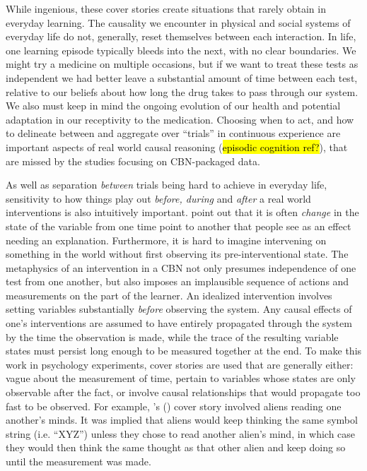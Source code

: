 \documentclass{cambridge7A}%
\def\citeapos#1{\citeauthor{#1}'s (\citeyear{#1})}
\DeclareMathOperator*{\Do}{do}
\begin{document}
While ingenious, these cover stories create situations that rarely obtain in everyday learning.  The causality we encounter in physical and social systems of everyday life do not, generally, reset themselves between each interaction.  In life, one learning episode typically bleeds into the next, with no clear boundaries.  We might try a medicine on multiple occasions, but if we want to treat these tests as independent we had better leave a substantial amount of time between each test, relative to our beliefs about how long the drug takes to pass through our system.  We also must keep in mind the ongoing evolution of our health and potential adaptation in our receptivity to the medication. Choosing when to act, and how to delineate between and aggregate over ``trials'' in continuous experience are important aspects of real world causal reasoning (\hl{episodic cognition ref?}), that are missed by the studies focusing on CBN-packaged data.  %

As well as separation \emph{between} trials being hard to achieve in everyday life, sensitivity to how things play out \emph{before, during} and \emph{after} a real world interventions is also intuitively important.   \cite{rottman2012causal} point out that it is often \emph{change} in the state of the variable from one time point to another that people see as an effect needing an explanation.  Furthermore, it is hard to imagine intervening on something in the world without first observing its pre-interventional state.  The metaphysics of an intervention in a CBN not only presumes independence of one test from one another, but also imposes an implausible sequence of actions and measurements on the part of the learner.  An idealized intervention involves setting variables substantially \emph{before} observing the system.  Any causal effects of one's interventions are assumed to have entirely propagated through the system by the time the observation is made, while the trace of the resulting variable states must persist long enough to be measured together at the end.  %
To make this work in psychology experiments, cover stories are used that are generally either: vague about the measurement of time, pertain to variables whose states are only observable after the fact, or  involve causal relationships that would propagate too fast to be observed.  For example, \citeapos{steyvers2003intervention} cover story involved aliens reading one another's minds.  It was implied that aliens would keep thinking the same symbol string (i.e. ``XYZ'') unless they chose to read another alien's mind, in which case they would then think the same thought as that other alien and keep doing so until the measurement was made. 
\end{document}
